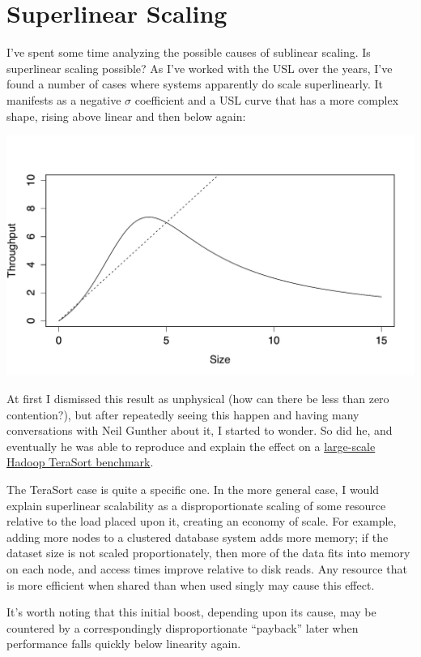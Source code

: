 \documentclass{vivid_layout}
\begin{document}
\section{Superlinear Scaling}

I've spent some time analyzing the possible causes of sublinear scaling. Is
superlinear scaling possible? As I've worked with the USL over the years, I've
found a number of cases where systems apparently do scale superlinearly. It
manifests as a negative $\sigma$ coefficient and a USL curve that has a more
complex shape, rising above linear and then below again:
\begin{center}
\includegraphics[width=.85\linewidth]{scalability/superlinear}
\end{center}

At first I dismissed this result as unphysical (how can there be less than zero
contention?), but after repeatedly seeing this happen and having many
conversations with Neil Gunther about it, I started to wonder. So did he, and
eventually he was able to reproduce and explain the effect on a
\href{https://queue.acm.org/detail.cfm?id=2789974}{large-scale Hadoop TeraSort
benchmark}.

The TeraSort case is quite a specific one. In the more general case, I would
explain superlinear scalability as a disproportionate scaling of some resource
relative to the load placed upon it, creating an economy of scale. For example,
adding more nodes to a clustered database system adds more memory; if the
dataset size is not scaled proportionately, then more of the data fits into
memory on each node, and access times improve relative to disk reads. Any
resource that is more efficient when shared than when used singly may cause this
effect.

It's worth noting that this initial boost, depending upon its cause, may be
countered by a correspondingly disproportionate ``payback'' later when
performance falls quickly below linearity again.
\end{document}
